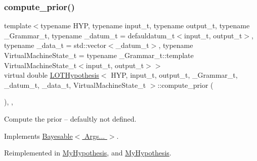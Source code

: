 \subsubsection{\texorpdfstring{compute\+\_\+prior()}{compute\_prior()}}
{\footnotesize\ttfamily template$<$typename H\+YP, typename input\+\_\+t, typename output\+\_\+t, typename \+\_\+\+Grammar\+\_\+t, typename \+\_\+datum\+\_\+t = defauldatum\+\_\+t$<$input\+\_\+t, output\+\_\+t$>$, typename \+\_\+data\+\_\+t = std\+::vector$<$\+\_\+datum\+\_\+t$>$, typename Virtual\+Machine\+State\+\_\+t = typename \+\_\+\+Grammar\+\_\+t\+::template Virtual\+Machine\+State\+\_\+t$<$input\+\_\+t, output\+\_\+t$>$$>$ \\
virtual double \hyperlink{class_l_o_t_hypothesis}{L\+O\+T\+Hypothesis}$<$ H\+YP, input\+\_\+t, output\+\_\+t, \+\_\+\+Grammar\+\_\+t, \+\_\+datum\+\_\+t, \+\_\+data\+\_\+t, Virtual\+Machine\+State\+\_\+t $>$\+::compute\+\_\+prior (\begin{DoxyParamCaption}{ }\end{DoxyParamCaption})\hspace{0.3cm}{\ttfamily [inline]}, {\ttfamily [override]}, {\ttfamily [virtual]}}



Compute the prior -- defaultly not defined. 



Implements \hyperlink{class_bayesable_a1b057a17212ced123545133e2297c01b}{Bayesable$<$ Args... $>$}.



Reimplemented in \hyperlink{class_my_hypothesis_ab092094c5fc31730de4f40609220bb18}{My\+Hypothesis}, and \hyperlink{class_my_hypothesis_a67477313b60b21158bbfaad35dc5d275}{My\+Hypothesis}.

\mbox{\label{class_l_o_t_hypothesis_a0ff11e5e328fcfa819a8dd9b5d57bd65}} 
